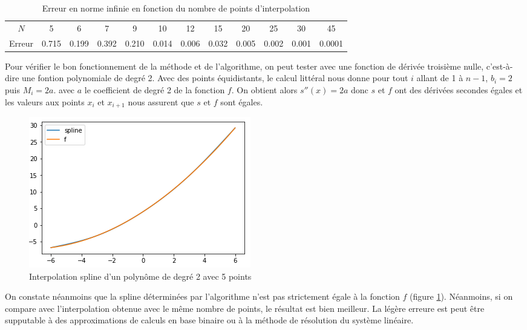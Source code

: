 \begin{table}[h]
  \centering
\begin{tabular}{cccccccccccc}
    $N$ & 5 & 6 & 7 & 9 & 10 & 12 & 15 & 20 & 25 & 30 & 45  \\
   Erreur & 0.715 & 0.199 & 0.392 & 0.210 & 0.014 & 0.006 & 0.032 & 0.005 & 0.002 & 0.001 & 0.0001 \\
\end{tabular}
  \caption{Erreur en norme infinie en fonction du nombre de points d'interpolation}
  \label{table:errspl}
\end{table}

Pour vérifier le bon fonctionnement de la méthode et de l'algorithme, on peut tester avec une fonction de dérivée troisième nulle,
c'est-à-dire une fontion polynomiale de degré 2. Avec des points équidistants, le calcul littéral nous donne pour tout $i$ allant de
1 à $n-1$, $b_i = 2$ puis $M_i = 2a$. avec $a$ le coefficient de degré 2 de la fonction $f$. On obtient alors $s''(x) = 2a$ donc $s$ et $f$
ont des dérivées secondes égales et les valeurs aux points $x_i$ et $x_{i+1}$ nous assurent que $s$ et $f$ sont égales.

\begin{figure}[h]
  \centering
  \includegraphics[scale=1.0]{fig9}
  \caption{Interpolation spline d'un polynôme de degré 2 avec 5 points}
  \label{fig:7:noerr}
\end{figure}

On constate néanmoins que la spline déterminées par l'algorithme n'est pas strictement égale à la fonction $f$ (figure \ref{fig:7:noerr}). Néanmoins, si on compare avec l'interpolation obtenue avec le même nombre de points, le résultat est bien meilleur. La légère erreure est peut être supputable à des approximations de calculs en base binaire ou à la méthode de résolution du système linéaire.

